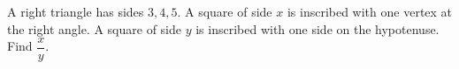 A right triangle has sides $3,4,5$. A square of side $x$ is inscribed with one vertex at the right angle. A square of side $y$ is inscribed with one side on the hypotenuse. Find $\dfrac xy$.
